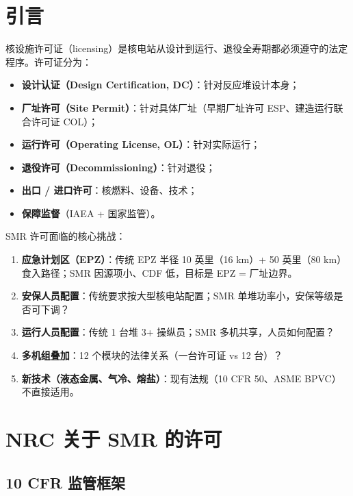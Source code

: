 \documentclass[
  UTF8,
  scheme=plain,
  fontsize=10pt,
  openany
]{ctexbook}
\begin{document}
\section{引言}\label{ux5f15ux8a00-10}

核设施许可证（licensing）是核电站从设计到运行、退役全寿期都必须遵守的法定程序。许可证分为：

\begin{itemize}
\tightlist
\item
  \textbf{设计认证（Design Certification, DC）}：针对反应堆设计本身；
\item
  \textbf{厂址许可（Site Permit）}：针对具体厂址（早期厂址许可
  ESP、建造运行联合许可证 COL）；
\item
  \textbf{运行许可（Operating License, OL）}：针对实际运行；
\item
  \textbf{退役许可（Decommissioning）}：针对退役；
\item
  \textbf{出口 / 进口许可}：核燃料、设备、技术；
\item
  \textbf{保障监督}（IAEA + 国家监管）。
\end{itemize}

SMR 许可面临的核心挑战：

\begin{enumerate}
\def\labelenumi{\arabic{enumi}.}
\tightlist
\item
  \textbf{应急计划区（EPZ）}：传统 EPZ 半径 10 英里（16 km）+ 50
  英里（80 km）食入路径；SMR 因源项小、CDF 低，目标是 EPZ = 厂址边界。
\item
  \textbf{安保人员配置}：传统要求按大型核电站配置；SMR
  单堆功率小，安保等级是否可下调？
\item
  \textbf{运行人员配置}：传统 1 台堆 3+ 操纵员；SMR
  多机共享，人员如何配置？
\item
  \textbf{多机组叠加}：12 个模块的法律关系（一台许可证 vs 12 台）？
\item
  \textbf{新技术（液态金属、气冷、熔盐）}：现有法规（10 CFR 50、ASME
  BPVC）不直接适用。
\end{enumerate}

\section{NRC 关于 SMR
的许可}\label{nrc-ux5173ux4e8e-smr-ux7684ux8bb8ux53ef}

\subsection{10 CFR 监管框架}\label{cfr-ux76d1ux7ba1ux6846ux67b6}
\end{document}
